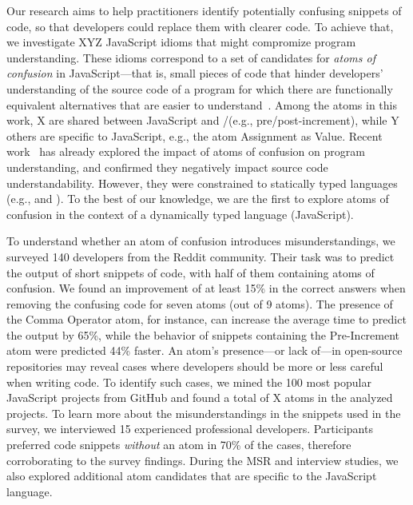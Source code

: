 Our research aims to help practitioners identify potentially confusing snippets of code, so that
developers could replace them with clearer code.
To achieve that, we investigate {\color{red}XYZ} JavaScript idioms that
might compromize program understanding. These idioms correspond to a set of candidates for \emph{atoms of confusion} in
JavaScript---that is, small
pieces of code that hinder developers' understanding of the source code of a program
for which there are functionally equivalent alternatives that are easier
to understand~\cite{DBLP:conf/sigsoft/GopsteinIYDZYC17}. 
Among the atoms in this work, X are shared between JavaScript and \clang/\cpplang (e.g., pre/post-increment), while Y others are specific to JavaScript, e.g., the atom Assignment as Value.
Recent work~\cite{DBLP:journals/ese/MedeirosLAAKRG19,DBLP:conf/sigsoft/GopsteinIYDZYC17} has
already explored the impact of atoms of confusion on program understanding,
and confirmed they negatively impact source code understandability.
However, they were constrained to statically typed languages (e.g., \clang and \cpplang).
To the best of our knowledge, we are the first to explore atoms of confusion
in the context of a dynamically typed language (JavaScript).


To understand whether an atom of confusion introduces misunderstandings, we surveyed 140 developers from the Reddit community. Their task was to predict the output of short snippets of code, with half of them containing atoms of confusion. We found an improvement of at least 15\% in the correct answers when removing the confusing code for seven atoms (out of 9 atoms). The presence of the Comma Operator atom, for instance, can increase the average time to predict the output by 65\%, while the behavior of snippets containing the Pre-Increment atom were predicted 44\% faster.  An atom's presence---or lack of---in open-source repositories may reveal cases where developers should be more or less careful when writing code. To identify such cases, we mined the 100 most popular JavaScript projects from GitHub and found a total of X atoms in the analyzed projects. To learn more about the misunderstandings in the snippets used in the survey, we interviewed 15 experienced professional developers. Participants preferred code snippets \textit{without} an atom in 70\% of the cases, therefore corroborating to the survey findings. During the MSR and interview studies, we also explored additional atom candidates that are specific to the
JavaScript language. 


